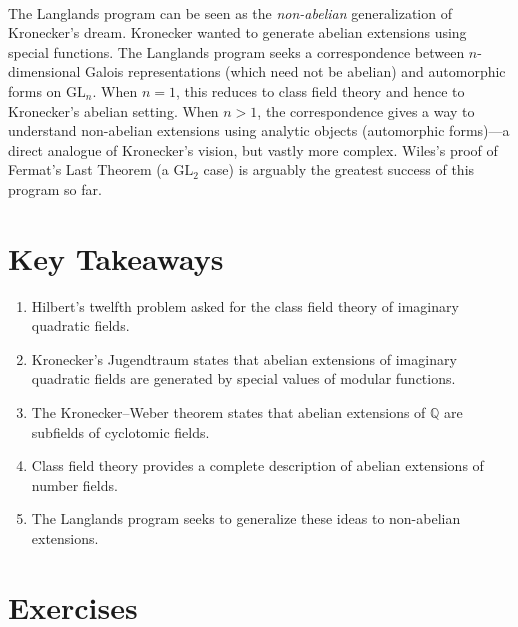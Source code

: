 \begin{description}[font=\bfseries, leftmargin=2em, style=nextline]
\item[Q: How does the Langlands program relate to Kronecker's Jugendtraum?]\hfill\\
The Langlands program can be seen as the \emph{non-abelian} generalization of Kronecker's dream. Kronecker wanted to generate abelian extensions using special functions. The Langlands program seeks a correspondence between $n$-dimensional Galois representations (which need not be abelian) and automorphic forms on $\mathrm{GL}_n$. When $n=1$, this reduces to class field theory and hence to Kronecker's abelian setting. When $n > 1$, the correspondence gives a way to understand non-abelian extensions using analytic objects (automorphic forms)---a direct analogue of Kronecker's vision, but vastly more complex. Wiles's proof of Fermat's Last Theorem (a $\mathrm{GL}_2$ case) is arguably the greatest success of this program so far.

\end{description}

\section*{Key Takeaways}

\begin{enumerate}
    \item Hilbert's twelfth problem asked for the class field theory of imaginary quadratic fields.
    \item Kronecker's Jugendtraum states that abelian extensions of imaginary quadratic fields are generated by special values of modular functions.
    \item The Kronecker--Weber theorem states that abelian extensions of $\mathbb{Q}$ are subfields of cyclotomic fields.
    \item Class field theory provides a complete description of abelian extensions of number fields.
    \item The Langlands program seeks to generalize these ideas to non-abelian extensions.
\end{enumerate}

\section*{Exercises}


